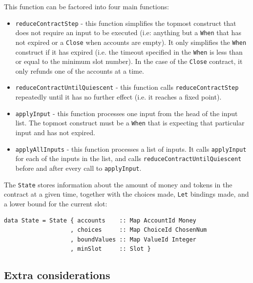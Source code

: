 \documentclass[english,runningheads]{llncs}
\begin{document}
This function can be factored into four main functions:
\begin{itemize}
\item \texttt{reduceContractStep} - this function simplifies the topmost
construct that does not require an input to be executed (i.e: anything
but a \texttt{When} that has not expired or a \texttt{Close} when
accounts are empty). It only simplifies the \texttt{When} construct
if it has expired (i.e. the timeout specified in the \texttt{When}
is less than or equal to the minimum slot number). In the case of
the \texttt{Close} contract, it only refunds one of the accounts at
a time. 
\item \texttt{reduceContractUntilQuiescent} - this function calls \texttt{reduceContractStep}
repeatedly until it has no further effect (i.e. it reaches a fixed
point). 
\item \texttt{applyInput} - this function processes one input from the head
of the input list. The topmost construct must be a \texttt{When} that
is expecting that particular input and has not expired. 
\item \texttt{applyAllInputs} - this function processes a list of inputs.
It calls \texttt{applyInput} for each of the inputs in the list, and
calls \texttt{reduceContractUntilQuiescent} before and after every
call to \texttt{applyInput}.
\end{itemize}
The \texttt{State} stores information about the amount of money and
tokens in the contract at a given time, together with the choices
made, \texttt{Let} bindings made, and a lower bound for the current
slot:

\begin{verbatim}
data State = State { accounts    :: Map AccountId Money
                   , choices     :: Map ChoiceId ChosenNum
                   , boundValues :: Map ValueId Integer
                   , minSlot     :: Slot }
\end{verbatim}

\subsection{Extra considerations\label{subsec:Extra-considerations}}
\end{document}
